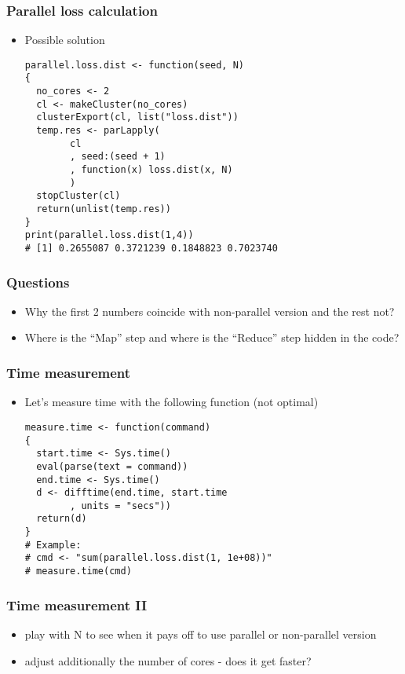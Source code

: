 \documentclass[bigger]{beamer}
\begin{document}
\begin{frame}[fragile]
\frametitle{Parallel loss calculation}
\label{sec-3-14}
\begin{itemize}

\item Possible solution\\
\label{sec-3-14-1}%
\begin{verbatim}
parallel.loss.dist <- function(seed, N)
{
  no_cores <- 2
  cl <- makeCluster(no_cores)
  clusterExport(cl, list("loss.dist"))
  temp.res <- parLapply(
        cl
        , seed:(seed + 1)
        , function(x) loss.dist(x, N)
        )
  stopCluster(cl)
  return(unlist(temp.res))
}
print(parallel.loss.dist(1,4))
# [1] 0.2655087 0.3721239 0.1848823 0.7023740
\end{verbatim}


\end{itemize} %
\end{frame}
\begin{frame}
\frametitle{Questions}
\label{sec-3-15}
\begin{itemize}

\item Why the first 2 numbers coincide with non-parallel version and the rest not?
\label{sec-3-15-1}%

\item Where is the ``Map'' step and where is the ``Reduce'' step hidden in the code?
\label{sec-3-15-2}%
\end{itemize} %
\end{frame}
\begin{frame}[fragile]
\frametitle{Time measurement}
\label{sec-3-16}
\begin{itemize}

\item Let's measure time with the following function (not optimal)\\
\label{sec-3-16-1}%
\begin{verbatim}
measure.time <- function(command)
{
  start.time <- Sys.time()
  eval(parse(text = command))
  end.time <- Sys.time()
  d <- difftime(end.time, start.time
        , units = "secs"))
  return(d)
}
# Example:
# cmd <- "sum(parallel.loss.dist(1, 1e+08))"
# measure.time(cmd)
\end{verbatim}


\end{itemize} %
\end{frame}
\begin{frame}
\frametitle{Time measurement II}
\label{sec-3-17}
\begin{itemize}

\item play with N to see when it pays off to use parallel or non-parallel version
\label{sec-3-17-1}%

\item adjust additionally the number of cores - does it get faster?
\label{sec-3-17-2}%
\end{itemize} %
\end{frame}
\end{document}
